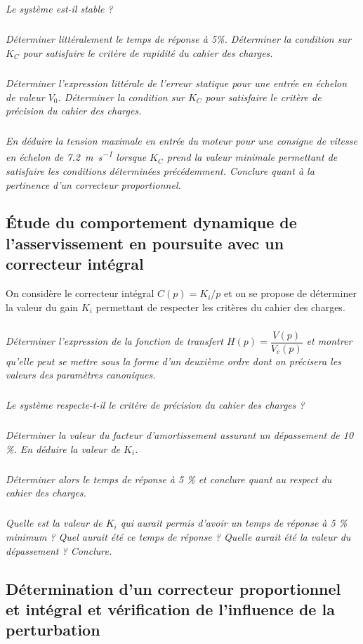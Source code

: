 \documentclass[10pt,fleqn]{article} %
\begin{document}
\subparagraph{}\textit{Le système est-il stable ?}

\subparagraph{}\textit{Déterminer littéralement le temps de réponse à 5\%. Déterminer la condition sur $K_C$ pour satisfaire le critère de rapidité du cahier des charges. }

\subparagraph{}\textit{ Déterminer l’expression littérale de l’erreur statique pour une entrée en échelon de valeur $V_0$. Déterminer la condition sur $K_C$ pour satisfaire le critère de précision du cahier des charges.  }

\subparagraph{}\textit{En déduire la tension maximale en entrée du moteur pour une consigne de vitesse en échelon de \SI{7,2}{m.s^{-1}} lorsque $K_C$ prend la valeur minimale permettant de satisfaire les conditions déterminées précédemment. Conclure quant à la pertinence d’un 
correcteur proportionnel. }

\subsection*{Étude du comportement dynamique de l’asservissement en poursuite avec un correcteur intégral }

On considère le correcteur intégral $C(p)=K_i/p$ et on se propose de déterminer la valeur du gain $K_i$ permettant de respecter les critères du cahier des charges. 


\subparagraph{}\textit{Déterminer l’expression de la fonction de transfert $H(p)=\dfrac{V(p)}{V_c(p)}$ et montrer qu’elle peut se mettre sous la forme d’un deuxième ordre dont on précisera les valeurs des paramètres canoniques.}

\subparagraph{}\textit{Le système respecte-t-il le critère de précision du cahier des charges ? }

\subparagraph{}\textit{Déterminer la valeur du facteur d’amortissement assurant un dépassement de 10 \%. En déduire la valeur de $K_i$. }

\subparagraph{}\textit{Déterminer alors le temps de réponse à 5 \% et conclure quant au respect du cahier des charges. }

\subparagraph{}\textit{Quelle est la valeur de $K_i$ qui aurait permis d’avoir un temps de réponse à 5 \% minimum ? Quel aurait été ce temps de réponse ? Quelle aurait été la valeur du dépassement ? Conclure. }

\subsection*{Détermination d’un correcteur proportionnel et intégral et vérification de l’influence de la perturbation }
\end{document}
